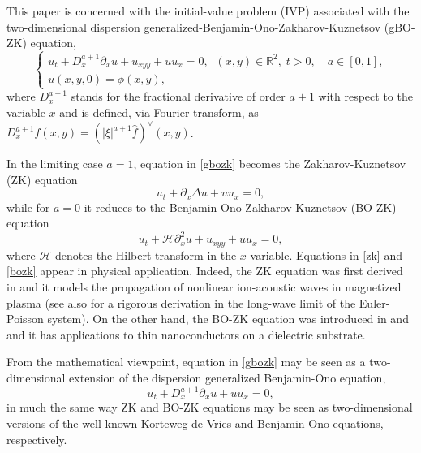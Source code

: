 \documentclass[reqno]{amsart}
\newcommand{\h}{\mathcal H}
\newcommand{\R}{\mathbb R}
\numberwithin{equation}{section}
\begin{document}
This paper is concerned with the initial-value problem (IVP) associated with the two-dimensional dispersion
generalized-Benjamin-Ono-Zakharov-Kuznetsov (gBO-ZK) equation,
\begin{equation}\label{gbozk}
\begin{cases}
u_{t}+D^{a+1}_x \partial_{x}u+u_{xyy}+uu_{x}=0, \;\;(x,y)\in\R^2, \;t>0, \quad a \in [0,1], \\
u(x,y,0)=\phi(x,y),
\end{cases}
\end{equation}
where $D^{a+1}_x$ stands for the fractional derivative of order $a+1$ with respect to the variable $x$ and is defined, via Fourier transform, as $D^{a+1}_x f(x,y)=(|\xi|^{a+1}\widehat{f})^\vee(x,y)$.

In the limiting case $a=1$, equation in \eqref{gbozk} becomes the Zakharov-Kuznetsov (ZK) equation
\begin{equation}\label{zk}
u_{t}+\partial_{x} \Delta u+uu_{x}=0, 
\end{equation}
while for $a=0$ it reduces to the Benjamin-Ono-Zakharov-Kuznetsov (BO-ZK) equation
\begin{equation}\label{bozk}
u_{t}+\mathcal{H}\partial_x^2 u+u_{xyy}+uu_{x}=0, 
\end{equation}
 where $\h$ denotes the Hilbert transform in the $x$-variable. Equations in \eqref{zk} and \eqref{bozk} appear in physical application. Indeed, the ZK equation was first derived in \cite{ZK} and it models the propagation of nonlinear ion-acoustic waves in magnetized  plasma (see also \cite{LLS} for a rigorous derivation in the long-wave limit of the Euler-Poisson system). On the other hand, the BO-ZK equation was introduced in \cite{Jorge} and \cite{Latorre} and it has
 applications to thin nanoconductors on a dielectric substrate.
 
 From the mathematical viewpoint, equation in \eqref{gbozk} may be seen as a two-dimensional extension of the dispersion generalized Benjamin-Ono equation,
\begin{equation}\label{dgbo}
u_{t}+D^{a+1}_x \partial_{x}u+uu_{x}=0,
\end{equation}
 in much the same way  ZK and BO-ZK equations may be seen as two-dimensional versions of the well-known Korteweg-de Vries and Benjamin-Ono equations, respectively.
 
\end{document}
